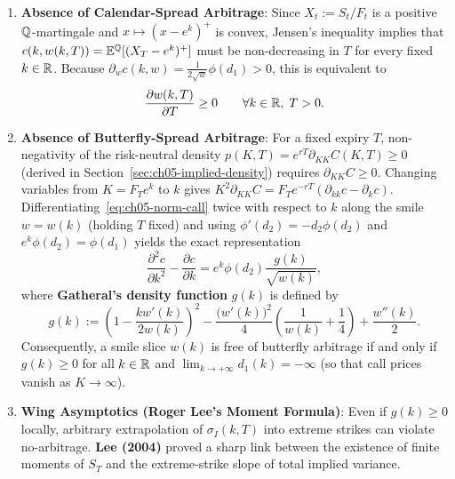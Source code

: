 \begin{enumerate}
    \item \textbf{Absence of Calendar-Spread Arbitrage}: Since $X_t := S_t / F_t$ is a positive $\mathbb{Q}$-martingale and $x \mapsto (x - e^k)^+$ is convex, Jensen's inequality implies that $c(k, w(k, T)) = \mathbb{E}^{\mathbb{Q}}[(X_T - e^k)^+]$ must be non-decreasing in $T$ for every fixed $k \in \mathbb{R}$. Because $\partial_w c(k, w) = \frac{1}{2\sqrt{w}}\phi(d_1) > 0$, this is equivalent to
    \begin{equation}
        \label{eq:ch05-cal-noarb}
        \frac{\partial w(k, T)}{\partial T} \ge 0 \qquad \forall k \in \mathbb{R},\; T > 0.
    \end{equation}

    \item \textbf{Absence of Butterfly-Spread Arbitrage}: For a fixed expiry $T$, non-negativity of the risk-neutral density $p(K, T) = e^{rT}\partial_{KK} C(K, T) \ge 0$ (derived in Section~\ref{sec:ch05-implied-density}) requires $\partial_{KK} C \ge 0$. Changing variables from $K = F_T e^k$ to $k$ gives $K^2 \partial_{KK} C = F_T e^{-rT}(\partial_{kk} c - \partial_k c)$. Differentiating~\eqref{eq:ch05-norm-call} twice with respect to $k$ along the smile $w = w(k)$ (holding $T$ fixed) and using $\phi'(d_2) = -d_2 \phi(d_2)$ and $e^k \phi(d_2) = \phi(d_1)$ yields the exact representation
    \[
        \frac{\partial^2 c}{\partial k^2} - \frac{\partial c}{\partial k}
        = e^k \phi(d_2)\frac{g(k)}{\sqrt{w(k)}},
    \]
    where \textbf{Gatheral's density function} $g(k)$ is defined by
    \begin{equation}
        \label{eq:ch05-gatheral-g}
        g(k) := \left(1 - \frac{k w'(k)}{2 w(k)}\right)^2
        - \frac{\bigl(w'(k)\bigr)^2}{4}\left(\frac{1}{w(k)} + \frac{1}{4}\right)
        + \frac{w''(k)}{2}.
    \end{equation}
    Consequently, a smile slice $w(k)$ is free of butterfly arbitrage if and only if $g(k) \ge 0$ for all $k \in \mathbb{R}$ and $\lim_{k \to +\infty} d_1(k) = -\infty$ (so that call prices vanish as $K \to \infty$).

    \item \textbf{Wing Asymptotics (Roger Lee's Moment Formula)}: Even if $g(k) \ge 0$ locally, arbitrary extrapolation of $\sigma_I(k, T)$ into extreme strikes can violate no-arbitrage. \textbf{Lee (2004)} proved a sharp link between the existence of finite moments of $S_T$ and the extreme-strike slope of total implied variance.
\end{enumerate}

